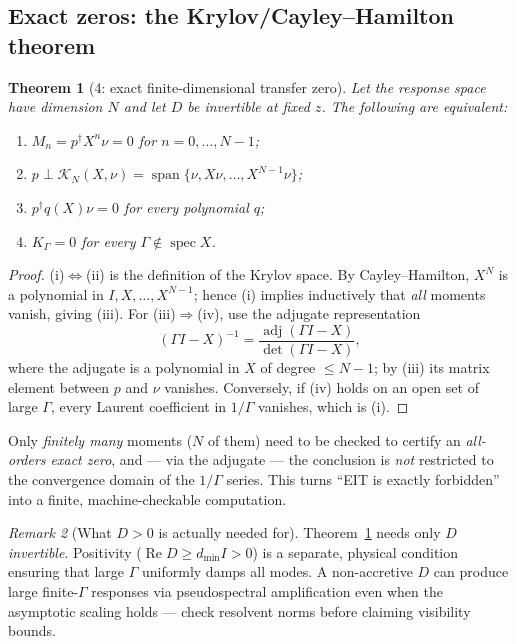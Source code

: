 \documentclass[11pt,a4paper]{article}
\newtheorem{theorem}{Theorem}[section]
\theoremstyle{remark}
\newtheorem{remark}[theorem]{Remark}
\newcommand{\adj}{\operatorname{adj}}
\newcommand{\spann}{\operatorname{span}}
\begin{document}
\subsection{Exact zeros: the Krylov/Cayley--Hamilton theorem}

\begin{theorem}[4: exact finite-dimensional transfer zero]
\label{thm:krylov}
Let the response space have dimension $N$ and let $D$ be invertible at fixed
$z$. The following are equivalent:
\begin{enumerate}[label=(\roman*)]
\item $M_n=p^\dagger X^n\nu=0$ for $n=0,\dots,N-1$;
\item $p\perp\mathcal K_N(X,\nu)
      =\spann\{\nu,X\nu,\dots,X^{N-1}\nu\}$;
\item $p^\dagger q(X)\nu=0$ for every polynomial $q$;
\item $K_\Gamma=0$ for every $\Gamma\notin\operatorname{spec}X$.
\end{enumerate}
\end{theorem}

\begin{proof}
(i)$\Leftrightarrow$(ii) is the definition of the Krylov space. By
Cayley--Hamilton, $X^N$ is a polynomial in $I,X,\dots,X^{N-1}$; hence (i)
implies inductively that \emph{all} moments vanish, giving (iii). For
(iii)$\Rightarrow$(iv), use the adjugate representation
\[
(\Gamma I-X)^{-1}=\frac{\adj(\Gamma I-X)}{\det(\Gamma I-X)},
\]
where the adjugate is a polynomial in $X$ of degree $\le N-1$; by (iii) its
matrix element between $p$ and $\nu$ vanishes. Conversely, if (iv) holds on an
open set of large $\Gamma$, every Laurent coefficient in $1/\Gamma$ vanishes,
which is (i).
\end{proof}

\begin{keyidea}
Only \emph{finitely many} moments ($N$ of them) need to be checked to certify
an \emph{all-orders exact zero}, and --- via the adjugate --- the conclusion
is \emph{not} restricted to the convergence domain of the $1/\Gamma$ series.
This turns ``EIT is exactly forbidden'' into a finite, machine-checkable
computation.
\end{keyidea}

\begin{remark}[What $D>0$ is actually needed for]
Theorem~\ref{thm:krylov} needs only $D$ \emph{invertible}. Positivity
($\operatorname{Re}D\ge d_{\min}I>0$) is a separate, physical condition
ensuring that large $\Gamma$ uniformly damps all modes. A non-accretive $D$
can produce large finite-$\Gamma$ responses via pseudospectral amplification
even when the asymptotic scaling holds --- check resolvent norms before
claiming visibility bounds.
\end{remark}
\end{document}
